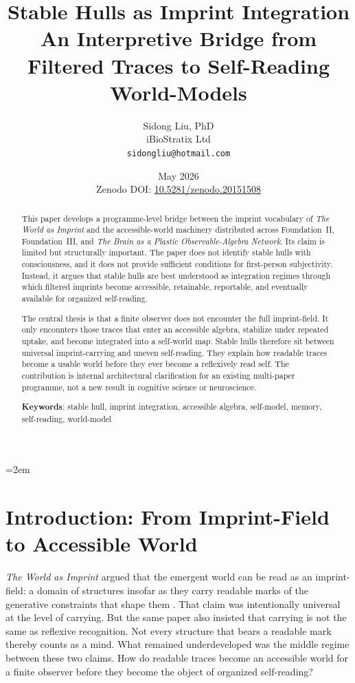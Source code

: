 \documentclass[12pt]{article}
\title{%
  \textbf{Stable Hulls as Imprint Integration}\\
  \textbf{An Interpretive Bridge from Filtered Traces to Self-Reading World-Models}%
}
\author{
  Sidong Liu, PhD \\
  \small iBioStratix Ltd \\
  \small \texttt{sidongliu@hotmail.com}
}
\date{May 2026\\
\small Zenodo DOI: \href{https://doi.org/10.5281/zenodo.20151508}{10.5281/zenodo.20151508}}
\begin{document}
\emergencystretch=2em
\raggedbottom
{}

\maketitle

\begin{abstract}
This paper develops a programme-level bridge between the imprint vocabulary of \emph{The World as Imprint} and the accessible-world machinery distributed across Foundation~II, Foundation~III, and \emph{The Brain as a Plastic Observable-Algebra Network}. Its claim is limited but structurally important. The paper does not identify stable hulls with consciousness, and it does not provide sufficient conditions for first-person subjectivity. Instead, it argues that stable hulls are best understood as integration regimes through which filtered imprints become accessible, retainable, reportable, and eventually available for organized self-reading.

The central thesis is that a finite observer does not encounter the full imprint-field. It only encounters those traces that enter an accessible algebra, stabilize under repeated uptake, and become integrated into a self-world map. Stable hulls therefore sit between universal imprint-carrying and uneven self-reading. They explain how readable traces become a usable world before they ever become a reflexively read self. The contribution is internal architectural clarification for an existing multi-paper programme, not a new result in cognitive science or neuroscience.

\medskip

\noindent\textbf{Keywords}: stable hull, imprint integration, accessible algebra, self-model, memory, self-reading, world-model
\end{abstract}

\clearpage
\tableofcontents
\clearpage

\section{Introduction: From Imprint-Field to Accessible World}

\emph{The World as Imprint} argued that the emergent world can be read as an imprint-field: a domain of structures insofar as they carry readable marks of the generative constraints that shape them \cite{WorldImprint}. That claim was intentionally universal at the level of carrying. But the same paper also insisted that carrying is not the same as reflexive recognition. Not every structure that bears a readable mark thereby counts as a mind. What remained underdeveloped was the middle regime between these two claims. How do readable traces become an accessible world for a finite observer before they become the object of organized self-reading?
\end{document}

